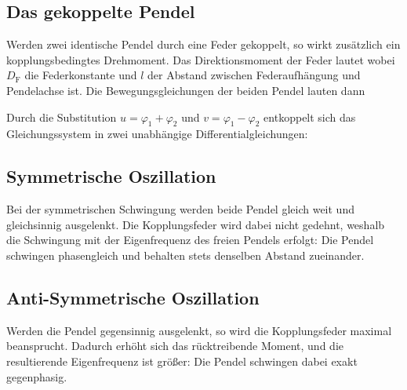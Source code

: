 \subsection{Das gekoppelte Pendel}

Werden zwei identische Pendel durch eine Feder gekoppelt, so wirkt zusätzlich ein kopplungsbedingtes Drehmoment. Das Direktionsmoment der Feder lautet
wobei \(D_\mathrm{F}\) die Federkonstante und \(l\) der Abstand zwischen Federaufhängung und Pendelachse ist. Die Bewegungsgleichungen der beiden Pendel lauten dann

Durch die Substitution \(u = \varphi_1 + \varphi_2\) und \(v = \varphi_1 - \varphi_2\) entkoppelt sich das Gleichungssystem in zwei unabhängige Differentialgleichungen:


\subsection{Symmetrische Oszillation}
Bei der symmetrischen Schwingung werden beide Pendel gleich weit und gleichsinnig ausgelenkt. Die Kopplungsfeder wird dabei nicht gedehnt, weshalb die Schwingung mit der Eigenfrequenz des freien Pendels erfolgt:
Die Pendel schwingen phasengleich und behalten stets denselben Abstand zueinander.


\subsection{Anti-Symmetrische Oszillation}

Werden die Pendel gegensinnig ausgelenkt, so wird die Kopplungsfeder maximal beansprucht. Dadurch erhöht sich das rücktreibende Moment, und die resultierende Eigenfrequenz ist größer:
Die Pendel schwingen dabei exakt gegenphasig.

